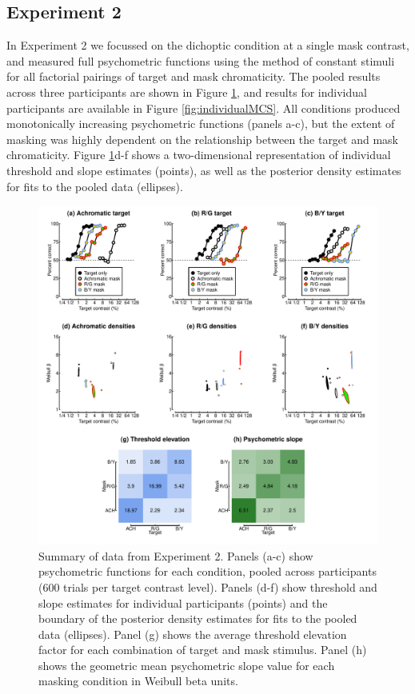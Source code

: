 \documentclass[
]{article}
\begin{document}
\hypertarget{experiment-2}{%
\subsection{Experiment 2}\label{experiment-2}}

In Experiment 2 we focussed on the dichoptic condition at a single mask contrast, and measured full psychometric functions using the method of constant stimuli for all factorial pairings of target and mask chromaticity. The pooled results across three participants are shown in Figure \ref{fig:MCSfig}, and results for individual participants are available in Figure \ref{fig:individualMCS}. All conditions produced monotonically increasing psychometric functions (panels a-c), but the extent of masking was highly dependent on the relationship between the target and mask chromaticity. Figure \ref{fig:MCSfig}d-f shows a two-dimensional representation of individual threshold and slope estimates (points), as well as the posterior density estimates for fits to the pooled data (ellipses).

\begin{figure}

{\centering \includegraphics{Figures/MCSdata} 

}

\caption{Summary of data from Experiment 2. Panels (a-c) show psychometric functions for each condition, pooled across participants (600 trials per target contrast level). Panels (d-f) show threshold and slope estimates for individual participants (points) and the boundary of the posterior density estimates for fits to the pooled data (ellipses). Panel (g) shows the average threshold elevation factor for each combination of target and mask stimulus. Panel (h) shows the geometric mean psychometric slope value for each masking condition in Weibull beta units.}\label{fig:MCSfig}
\end{figure}
\end{document}
